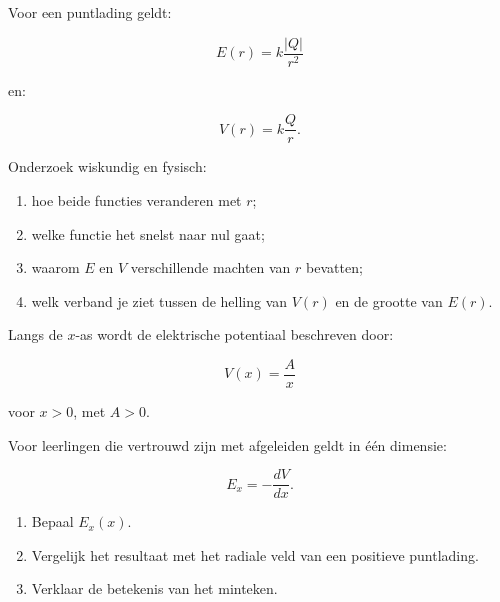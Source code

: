 \documentclass{ximera}
\begin{document}
\begin{oefening}{\oefG}

Voor een puntlading geldt:

\[
E(r)=k\frac{|Q|}{r^2}
\]

en:

\[
V(r)=k\frac{Q}{r}.
\]

Onderzoek wiskundig en fysisch:

\begin{enumerate}
  \item hoe beide functies veranderen met $r$;
  \item welke functie het snelst naar nul gaat;
  \item waarom $E$ en $V$ verschillende machten van $r$ bevatten;
  \item welk verband je ziet tussen de helling van $V(r)$ en de
        grootte van $E(r)$.
\end{enumerate}

\end{oefening}


\begin{oefening}{\oefG}

Langs de $x$-as wordt de elektrische potentiaal beschreven door:

\[
V(x)=\frac{A}{x}
\]

voor $x>0$, met $A>0$.

Voor leerlingen die vertrouwd zijn met afgeleiden geldt in één
dimensie:

\[
E_x=-\frac{dV}{dx}.
\]

\begin{enumerate}
  \item Bepaal $E_x(x)$.
  \item Vergelijk het resultaat met het radiale veld van een positieve
        puntlading.
  \item Verklaar de betekenis van het minteken.
\end{enumerate}

\end{oefening}
\end{document}

